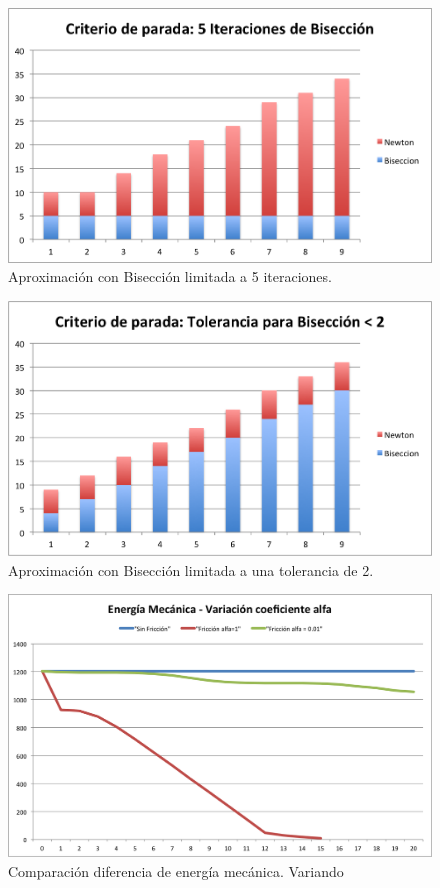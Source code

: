 \documentclass[a4paper]{article}
\begin{document}
\begin{figure}[H]
  \centering
  \includegraphics[scale=0.80]{graficos/2-BiseccionXIteraciones.png}
  \caption{Aproximación con Bisección limitada a 5 iteraciones. }
\end{figure}

\begin{figure}[H]
  \centering
  \includegraphics[scale=0.80]{graficos/3-BiseccionXTolerancia.png}
  \caption{Aproximación con Bisección limitada a una tolerancia de 2. }
\end{figure}

\begin{figure}[H]
  \centering
  \includegraphics[scale=0.75]{graficos/4-energiaMecanica-alpha.png}
  \caption{Comparación diferencia de energía mecánica. Variando \alpha }
\end{figure}
\end{document}
